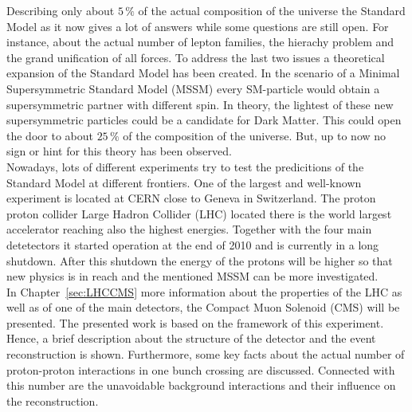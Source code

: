 Describing only about $5\,\%$ of the actual composition of the universe the Standard Model as it now gives a lot of answers while some questions are still open. For instance, about the actual number of lepton families, the hierachy problem and the grand unification of all forces. To address the last two issues a theoretical expansion of the Standard Model has been created. In the scenario of a Minimal Supersymmetric Standard Model (MSSM) every SM-particle would obtain a supersymmetric partner with different spin. In theory, the lightest of these new supersymmetric particles could be a candidate for Dark Matter. This could open the door to about $25\,\%$ of the composition of the universe. But, up to now no sign or hint for this theory has been observed. \\

Nowadays, lots of different experiments try to test the predicitions of the Standard Model at different frontiers. One of the largest and well-known experiment is located at CERN  close to Geneva in Switzerland. The proton proton collider Large Hadron Collider (LHC) located there is the world largest accelerator reaching also the highest energies. Together with the four main detetectors it started operation at the end of 2010 and is currently in a long shutdown. After this shutdown the energy of the protons will be higher so that new physics is in reach and the mentioned MSSM can be more investigated. \\

In Chapter~\ref{sec:LHCCMS} more information about the properties of the LHC as well as of one of the main detectors, the Compact Muon Solenoid (CMS) will be presented. The presented work is based on the framework of this experiment. Hence, a brief description about the structure of the detector and the event reconstruction is shown. Furthermore, some key facts about the actual number of proton-proton interactions in one bunch crossing are discussed. Connected with this number are the unavoidable background interactions and their influence on the reconstruction. 